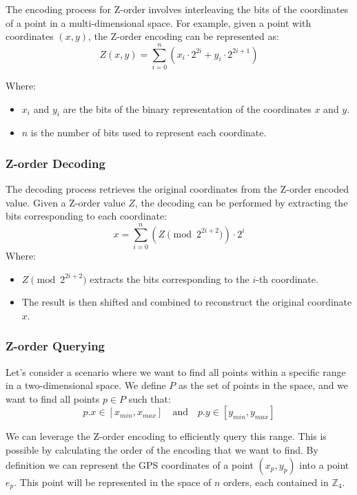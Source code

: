 \documentclass[12pt,a4paper,twoside]{book}
\begin{document}
The encoding process for Z-order involves interleaving the bits of the coordinates of a point in a multi-dimensional space. For example, given a point with coordinates \( (x, y) \), the Z-order encoding can be represented as:
\[
    Z(x, y) = \sum_{i=0}^{n} (x_i \cdot 2^{2i} + y_i \cdot 2^{2i+1})
\]

Where:
\begin{itemize}
    \item \( x_i \) and \( y_i \) are the bits of the binary representation of the coordinates \( x \) and \( y \).
    \item \( n \) is the number of bits used to represent each coordinate.
\end{itemize}

\subsubsection{Z-order Decoding}
The decoding process retrieves the original coordinates from the Z-order encoded value. Given a Z-order value \( Z \), the decoding can be performed by extracting the bits corresponding to each coordinate:
\[
    x = \sum_{i=0}^{n} (Z \pmod{ 2^{2i+2} }) \cdot 2^i
\]
Where:
\begin{itemize}
    \item \( Z \pmod{ 2^{2i+2} } \) extracts the bits corresponding to the \( i \)-th coordinate.
    \item The result is then shifted and combined to reconstruct the original coordinate \( x \).
\end{itemize}

\subsubsection{Z-order Querying}
Let's consider a scenario where we want to find all points within a specific range in a two-dimensional space. We define \( P \) as the set of points in the space, and we want to find all points \( p \in P \) such that:
\[
    p.x \in [x_{min}, x_{max}] \quad \text{and} \quad p.y \in [y_{min}, y_{max}]
\]

We can leverage the Z-order encoding to efficiently query this range. This is possible by calculating the order of the encoding that we want to find. 
By definition we can represent the GPS coordinates of a point \( (x_p, y_p) \) into a point \( e_p \). This point will be represented in the space of \( n \) orders, each contained in \( \mathbb{Z}_4 \).
\end{document}
